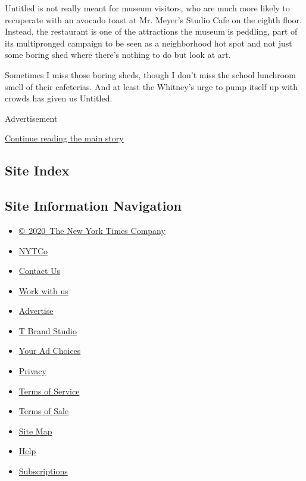 Untitled is not really meant for museum visitors, who are much more
likely to recuperate with an avocado toast at Mr. Meyer's Studio Cafe on
the eighth floor. Instead, the restaurant is one of the attractions the
museum is peddling, part of its multipronged campaign to be seen as a
neighborhood hot spot and not just some boring shed where there's
nothing to do but look at art.

Sometimes I miss those boring sheds, though I don't miss the school
lunchroom smell of their cafeterias. And at least the Whitney's urge to
pump itself up with crowds has given us Untitled.

Advertisement

\protect\hyperlink{after-bottom}{Continue reading the main story}

\hypertarget{site-index}{%
\subsection{Site Index}\label{site-index}}

\hypertarget{site-information-navigation}{%
\subsection{Site Information
Navigation}\label{site-information-navigation}}

\begin{itemize}
\tightlist
\item
  \href{https://help.nytimes3xbfgragh.onion/hc/en-us/articles/115014792127-Copyright-notice}{©~2020~The
  New York Times Company}
\end{itemize}

\begin{itemize}
\tightlist
\item
  \href{https://www.nytco.com/}{NYTCo}
\item
  \href{https://help.nytimes3xbfgragh.onion/hc/en-us/articles/115015385887-Contact-Us}{Contact
  Us}
\item
  \href{https://www.nytco.com/careers/}{Work with us}
\item
  \href{https://nytmediakit.com/}{Advertise}
\item
  \href{http://www.tbrandstudio.com/}{T Brand Studio}
\item
  \href{https://www.nytimes3xbfgragh.onion/privacy/cookie-policy\#how-do-i-manage-trackers}{Your
  Ad Choices}
\item
  \href{https://www.nytimes3xbfgragh.onion/privacy}{Privacy}
\item
  \href{https://help.nytimes3xbfgragh.onion/hc/en-us/articles/115014893428-Terms-of-service}{Terms
  of Service}
\item
  \href{https://help.nytimes3xbfgragh.onion/hc/en-us/articles/115014893968-Terms-of-sale}{Terms
  of Sale}
\item
  \href{https://spiderbites.nytimes3xbfgragh.onion}{Site Map}
\item
  \href{https://help.nytimes3xbfgragh.onion/hc/en-us}{Help}
\item
  \href{https://www.nytimes3xbfgragh.onion/subscription?campaignId=37WXW}{Subscriptions}
\end{itemize}
